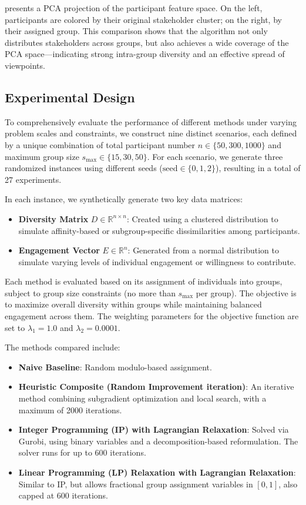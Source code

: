  presents a PCA projection of the participant feature space.
On the left, participants are colored by their original stakeholder cluster;
on the right, by their assigned group.
This comparison shows that the algorithm not only distributes stakeholders across groups,
but also achieves a wide coverage of the PCA space—indicating strong intra-group diversity
and an effective spread of viewpoints.

\subsection{Experimental Design}

To comprehensively evaluate the performance of different methods under varying problem scales and constraints, we construct nine distinct scenarios, each defined by a unique combination of total participant number $n \in \{50, 300, 1000\}$ and maximum group size $s_{\max} \in \{15, 30, 50\}$. For each scenario, we generate three randomized instances using different seeds ($\text{seed} \in \{0, 1, 2\}$), resulting in a total of 27 experiments.

In each instance, we synthetically generate two key data matrices:
\begin{itemize}
    \item \textbf{Diversity Matrix} $D \in \mathbb{R}^{n \times n}$: Created using a clustered distribution to simulate affinity-based or subgroup-specific dissimilarities among participants.
    \item \textbf{Engagement Vector} $E \in \mathbb{R}^n$: Generated from a normal distribution to simulate varying levels of individual engagement or willingness to contribute.
\end{itemize}

Each method is evaluated based on its assignment of individuals into groups, subject to group size constraints (no more than $s_{\max}$ per group). The objective is to maximize overall diversity within groups while maintaining balanced engagement across them. The weighting parameters for the objective function are set to $\lambda_1 = 1.0$ and $\lambda_2 = 0.0001$.

The methods compared include:
\begin{itemize}
    \item \textbf{Naive Baseline}: Random modulo-based assignment.
    \item \textbf{Heuristic Composite (Random Improvement iteration)}: An iterative method combining subgradient optimization and local search, with a maximum of 2000 iterations.
    \item \textbf{Integer Programming (IP) with Lagrangian Relaxation}: Solved via Gurobi, using binary variables and a decomposition-based reformulation. The solver runs for up to 600 iterations.
    \item \textbf{Linear Programming (LP) Relaxation with Lagrangian Relaxation}: Similar to IP, but allows fractional group assignment variables in $[0, 1]$, also capped at 600 iterations.
\end{itemize}

